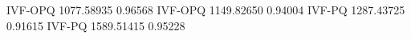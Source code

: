 IVF-OPQ 1077.58935 0.96568
IVF-OPQ 1149.82650 0.94004
IVF-PQ 1287.43725 0.91615
IVF-PQ 1589.51415 0.95228
